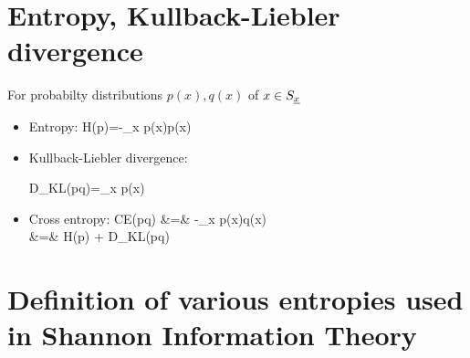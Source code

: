 \section{Entropy, Kullback-Liebler divergence}

For probabilty distributions $p(x), q(x)$ of $x\in S_{\underline{x}}$
\begin{itemize}
\item 
Entropy:
\beq
H(p)=-\sum_x p(x)\ln p(x)
\eeq

\item
Kullback-Liebler divergence:

\beq
D_{KL}(p\parallel q)=\sum_{x} p(x)\ln {}
\eeq
\item 
Cross entropy:
\beqa
CE(p\rarrow q) &=& -\sum_x p(x)\ln q(x)\\
&=& H(p) + D_{KL}(p\parallel q)
\eeqa
\end{itemize}

\section{Definition of various
entropies used in Shannon Information Theory}

